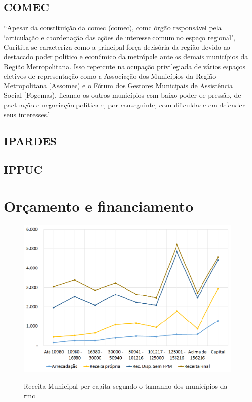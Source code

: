 	\subsection{COMEC}
	
	\begin{citacao}
		``Apesar da constituição da \glsdesc{comec} (\gls{comec}), como órgão responsável pela `articulação e coordenação das ações de interesse comum no espaço regional', Curitiba se caracteriza como a principal força decisória da região devido ao destacado poder político e econômico da metrópole ante os demais municípios da Região Metropolitana. Isso repercute na ocupação privilegiada de vários espaços eletivos de representação como a Associação dos	Municípios da Região Metropolitana (Assomec) e o Fórum dos Gestores Municipais
		de Assistência Social (Fogemas), ficando os outros municípios com baixo poder de pressão, de pactuação e negociação política e, por conseguinte, com dificuldade	em defender seus interesses.'' \cite[p. 84]{colin2009a}
	\end{citacao}
	
	\subsection{IPARDES}
	
	\subsection{IPPUC}
	
	\section{Orçamento e financiamento}
		
	\begin{figure}
		\centering
		\caption{Receita Municipal per capita segundo o tamanho dos municípios da \gls{rmc}}
		\includegraphics[width=1.0\linewidth]{img/orcamento_A}
		\label{fig:orcamento}
	\end{figure}
	
